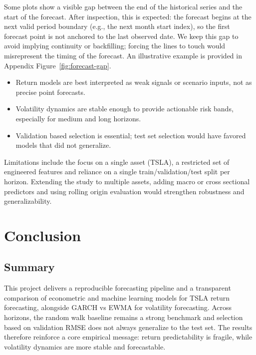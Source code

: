 \documentclass[11pt,a4paper]{article}
\begin{document}
\noindent Some plots show a visible gap between the end of the historical series and the start of the forecast. After inspection, this is expected: the forecast begins at the next valid period boundary (e.g., the next month start index), so the first forecast point is not anchored to the last observed date. We keep this gap to avoid implying continuity or backfilling; forcing the lines to touch would misrepresent the timing of the forecast. An illustrative example is provided in Appendix Figure~\ref{fig:forecast-gap}.

\begin{itemize}
\setlength{\itemsep}{0.1\baselineskip}
    \item Return models are best interpreted as weak signals or scenario inputs, not as precise point forecasts.
    \item Volatility dynamics are stable enough to provide actionable risk bands, especially for medium and long horizons.
    \item Validation based selection is essential; test set selection would have favored models that did not generalize.
\end{itemize}

Limitations include the focus on a single asset (TSLA), a restricted set of engineered features and reliance on a single train/validation/test split per horizon. Extending the study to multiple assets, adding macro or cross sectional predictors and using rolling origin evaluation would strengthen robustness and generalizability.
\endgroup

\section{Conclusion}
\label{sec:conclusion}

\subsection{Summary}
\begingroup
\setlength{\parskip}{0.5\baselineskip}
\setlength{\parindent}{1.25em}
\hspace*{\parindent}This project delivers a reproducible forecasting pipeline and a transparent comparison of econometric and machine learning models for TSLA return forecasting, alongside GARCH vs EWMA for volatility forecasting. Across horizons, the random walk baseline remains a strong benchmark and selection based on validation RMSE does not always generalize to the test set. The results therefore reinforce a core empirical message: return predictability is fragile, while volatility dynamics are more stable and forecastable.
\end{document}
